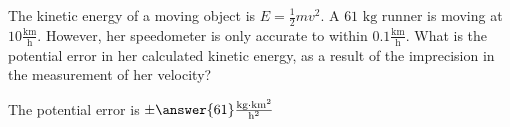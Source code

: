 \documentclass{ximera}
\author{Steven Gubkin}
\begin{document}
\begin{exercise}



The kinetic energy of a moving object is $E = \frac{1}{2} mv^2$.  A $61 \text{ kg}$ runner is moving at $10 \frac{\textrm{km}}{\textrm{h}}$.  However, her speedometer is only accurate to within $0.1 \frac{\textrm{km}}{\textrm{h}}$.  What is the potential error in her calculated kinetic energy, as a result of the imprecision in the measurement of her velocity?

\begin{prompt}
	The potential error is $\pm \answer{61} \frac{\textrm{kg} \cdot \textrm{km}^2}{\textrm{h}^2}$ 
\end{prompt}

\end{exercise}
\end{document}
